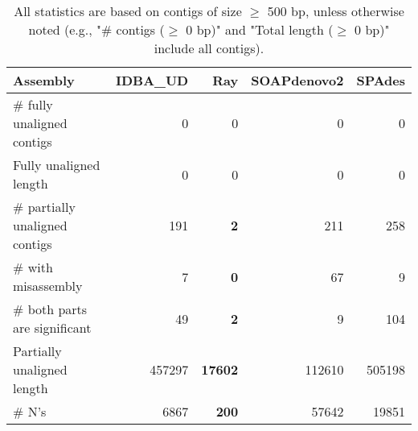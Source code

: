 \documentclass[12pt,a4paper]{article}
\begin{document}
\begin{table}[ht]
\begin{center}
\caption{All statistics are based on contigs of size $\geq$ 500 bp, unless otherwise noted (e.g., "\# contigs ($\geq$ 0 bp)" and "Total length ($\geq$ 0 bp)" include all contigs).}
\begin{tabular}{|l*{4}{|r}|}
\hline
Assembly & IDBA\_UD & Ray & SOAPdenovo2 & SPAdes \\ \hline
\# fully unaligned contigs & 0 & 0 & 0 & 0 \\ \hline
Fully unaligned length & 0 & 0 & 0 & 0 \\ \hline
\# partially unaligned contigs & 191 & {\bf 2} & 211 & 258 \\ \hline
\hspace{5mm}\# with misassembly & 7 & {\bf 0} & 67 & 9 \\ \hline
\hspace{5mm}\# both parts are significant & 49 & {\bf 2} & 9 & 104 \\ \hline
Partially unaligned length & 457297 & {\bf 17602} & 112610 & 505198 \\ \hline
\# N's & 6867 & {\bf 200} & 57642 & 19851 \\ \hline
\end{tabular}
\end{center}
\end{table}
\end{document}

